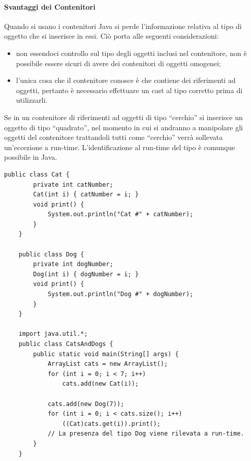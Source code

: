 \documentclass[12pt]{report}
\begin{document}
	\paragraph{Svantaggi dei Contenitori} Quando si usano i contenitori Java si perde l'informazione relativa al tipo di oggetto che si inserisce in essi. Ciò porta alle seguenti considerazioni:
	\begin{itemize}
		\item non essendoci controllo sul tipo degli oggetti inclusi nel contenitore, non è possibile essere sicuri di avere dei contenitori di oggetti omogenei;
		\item l'unica cosa che il contenitore conosce è che contiene dei riferimenti ad oggetti, pertanto è necessario effettuare un cast al tipo corretto prima di utilizzarli.
	\end{itemize}
	Se in un contenitore di riferimenti ad oggetti di tipo ``cerchio'' si inserisce un oggetto di tipo ``quadrato'', nel momento in cui si andranno a manipolare gli oggetti del contenitore trattandoli tutti come ``cerchio'' verrà sollevata un'eccezione a run-time. L'identificazione al run-time del tipo è comunque possibile in Java.
	\begin{lstlisting}[style=javastyle]
	public class Cat {
		private int catNumber;
		Cat(int i) { catNumber = i; }
		void print() {
			System.out.println("Cat #" + catNumber);
		}
	}

	public class Dog {
		private int dogNumber;
		Dog(int i) { dogNumber = i; }
		void print() {
			System.out.println("Dog #" + dogNumber);
		}
	}

	import java.util.*;
	public class CatsAndDogs {
		public static void main(String[] args) {
			ArrayList cats = new ArrayList();
			for (int i = 0; i < 7; i++)
				cats.add(new Cat(i));

			cats.add(new Dog(7));
			for (int i = 0; i < cats.size(); i++)
				((Cat)cats.get(i)).print();
			// La presenza del tipo Dog viene rilevata a run-time.
		}
	}
	\end{lstlisting}
\end{document}
